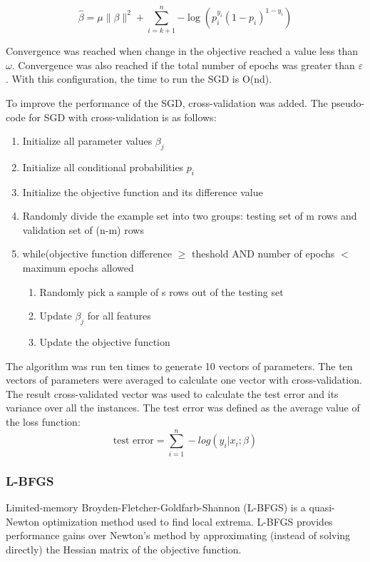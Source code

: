 \begin{equation}
    \widehat{\beta} = \mu \|\beta\|^2 + \sum_{i=k+1}^{n}{-\log(p_i^{y_i}(1 - p_i)^{1-y_i})}
\end{equation}

Convergence was reached when change in the objective reached a value less than $\omega$. Convergence was also reached if the total number of epochs was greater than $\varepsilon$. With this configuration, the time to run the SGD is O(nd).

To improve the performance of the SGD, cross-validation was added. The pseudo-code for SGD with cross-validation is as follows:
\begin{enumerate}
    \item Initialize all parameter values $\beta_j$
    \item Initialize all conditional probabilities $p_i$
    \item Initialize the objective function and its difference value
    \item Randomly divide the example set into two groups: testing set of m rows and validation set of (n-m) rows
    \item while(objective function difference $\geq$ theshold AND number of epochs $<$ maximum epochs allowed
    \begin{enumerate}
        \item Randomly pick a sample of s rows out of the testing set
        \item Update $\beta_j$ for all features
        \item Update the objective function
    \end{enumerate}
\end{enumerate}

The algorithm was run ten times to generate 10 vectors of parameters. The ten vectors of parameters were averaged to calculate one vector with cross-validation. The result cross-validated vector was used to calculate the test error and its variance over all the instances. The test error was defined as the average value of the loss function:
\begin{equation}
        \textrm{test error} = \sum_{i=1}^{n} -log(y_i | x_i ; \beta )
\end{equation}


\subsubsection{L-BFGS}
Limited-memory Broyden-Fletcher-Goldfarb-Shannon (L-BFGS) is a quasi-Newton optimization method used to find local extrema. L-BFGS provides performance gains over Newton's method by approximating (instead of solving directly) the Hessian matrix of the objective function.



